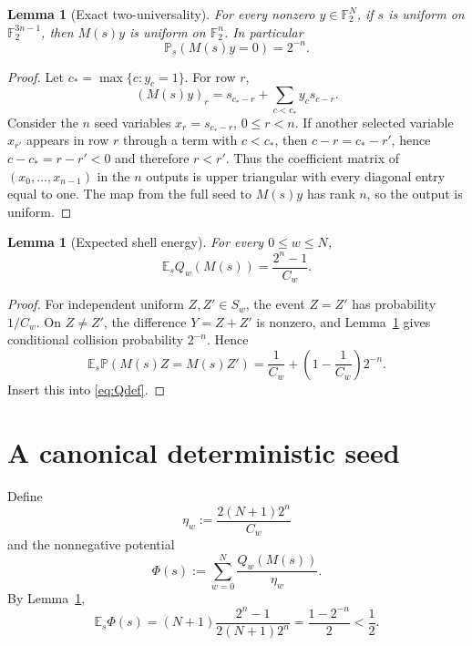 \documentclass[11pt]{article}
\newtheorem{lemma}[theorem]{Lemma}
\newcommand{\F}{\mathbb F}
\newcommand{\1}{\mathbf 1}
\newcommand{\E}{\mathbb E}
\newcommand{\Pp}{\mathbb P}
\begin{document}
\begin{lemma}[Exact two-universality]\label{lem:universal}
For every nonzero $y\in\F_2^N$, if $s$ is uniform on $\F_2^{3n-1}$, then $M(s)y$ is uniform on $\F_2^n$.  In particular
\[
 \Pp_s(M(s)y=0)=2^{-n}.
\]
\end{lemma}

\begin{proof}
Let $c_*=\max\{c:y_c=1\}$.  For row $r$,
\[
 (M(s)y)_r=s_{c_*-r}+\sum_{c<c_*}y_c s_{c-r}.
\]
Consider the $n$ seed variables $x_r=s_{c_*-r}$, $0\le r<n$.  If another selected variable $x_{r'}$ appears in row $r$ through a term with $c<c_*$, then
$c-r=c_*-r'$, hence $c-c_*=r-r'<0$ and therefore $r<r'$.  Thus the coefficient matrix of $(x_0,\dots,x_{n-1})$ in the $n$ outputs is upper triangular with every diagonal entry equal to one.  The map from the full seed to $M(s)y$ has rank $n$, so the output is uniform.
\end{proof}

\begin{lemma}[Expected shell energy]\label{lem:EQ}
For every $0\le w\le N$,
\[
 \E_s Q_w(M(s))=\frac{2^n-1}{C_w}.
\]
\end{lemma}

\begin{proof}
For independent uniform $Z,Z'\in S_w$, the event $Z=Z'$ has probability $1/C_w$.  On $Z\ne Z'$, the difference $Y=Z+Z'$ is nonzero, and Lemma~\ref{lem:universal} gives conditional collision probability $2^{-n}$.  Hence
\[
 \E_s\Pp(M(s)Z=M(s)Z')
 =\frac1{C_w}+\left(1-\frac1{C_w}\right)2^{-n}.
\]
Insert this into \eqref{eq:Qdef}.
\end{proof}

\section{A canonical deterministic seed}

Define
\begin{equation}\label{eq:eta}
 \eta_w:=\frac{2(N+1)2^n}{C_w}
\end{equation}
and the nonnegative potential
\begin{equation}\label{eq:Phi}
 \Phi(s):=\sum_{w=0}^N\frac{Q_w(M(s))}{\eta_w}.
\end{equation}
By Lemma~\ref{lem:EQ},
\begin{equation}\label{eq:EPhi}
 \E_s\Phi(s)
 =(N+1)\frac{2^n-1}{2(N+1)2^n}
 =\frac{1-2^{-n}}2<\frac12.
\end{equation}
\end{document}
